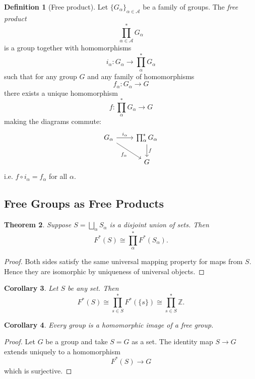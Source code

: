 \documentclass[11pt,a4paper]{article}
\theoremstyle{definition}
\newtheorem{definition}{Definition}[section]
\theoremstyle{plain}
\newtheorem{theorem}[definition]{Theorem}
\newtheorem{corollary}[definition]{Corollary}
\theoremstyle{remark}
\newcommand{\1}{\mathbbm{1}}
\begin{document}
\begin{definition}[Free product]
Let $\{G_\alpha\}_{\alpha\in\mathcal A}$ be a family of groups.
The \emph{free product}
\[
\prod_{\alpha\in\mathcal A}^{*} G_\alpha
\]
is a group together with homomorphisms
\[
i_\alpha : G_\alpha \to \prod_{\alpha}^{*} G_\alpha
\]
such that for any group $G$ and any family of homomorphisms
\[
f_\alpha : G_\alpha \to G
\]
there exists a unique homomorphism
\[
f : \prod_{\alpha}^{*} G_\alpha \to G
\]
making the diagrams commute:
\[
\begin{tikzcd}
G_\alpha \arrow[r,"i_\alpha"] \arrow[dr,"f_\alpha"'] &
\prod_{\alpha}^{*} G_\alpha \arrow[d,"f"] \\
& G
\end{tikzcd}
\]
i.e. $f\circ i_\alpha = f_\alpha$ for all $\alpha$.
\end{definition}

\subsection*{Free Groups as Free Products}

\begin{theorem}
Suppose $S=\bigsqcup_\alpha S_\alpha$ is a disjoint union of sets.
Then
\[
F^*(S) \cong \prod_{\alpha}^{*} F^*(S_\alpha).
\]
\end{theorem}

\begin{proof}
Both sides satisfy the same universal mapping property for maps from $S$.
Hence they are isomorphic by uniqueness of universal objects.
\end{proof}

\begin{corollary}
Let $S$ be any set. Then
\[
F^*(S) \cong \prod_{s\in S}^{*} F^*(\{s\})
\cong \prod_{s\in S}^{*} \mathbb Z.
\]
\end{corollary}

\begin{corollary}
Every group is a homomorphic image of a free group.
\end{corollary}

\begin{proof}
Let $G$ be a group and take $S=G$ as a set.
The identity map $S\to G$ extends uniquely to a homomorphism
\[
F^*(S)\to G
\]
which is surjective.
\end{proof}
\end{document}
